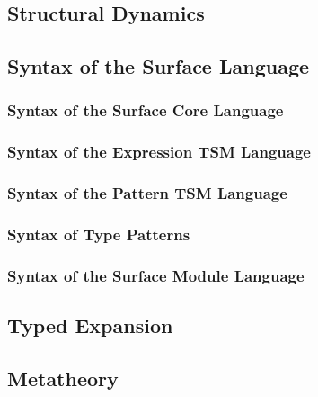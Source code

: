 \subsection{Structural Dynamics}
\subsection{Syntax of the Surface Language}
\subsubsection{Syntax of the Surface Core Language}
\subsubsection{Syntax of the Expression TSM Language}
\subsubsection{Syntax of the Pattern TSM Language}
\subsubsection{Syntax of Type Patterns}
\subsubsection{Syntax of the Surface Module Language}

\subsection{Typed Expansion}
\subsection{Metatheory}

